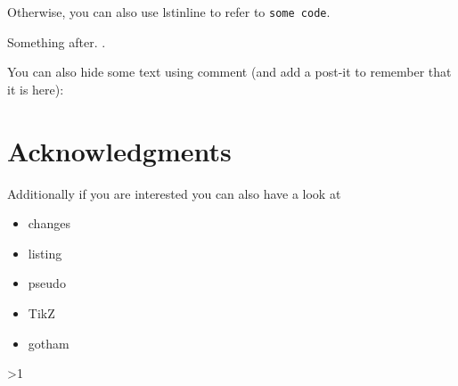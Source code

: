 \documentclass[a4paper]{article}  %
\newcommand{\Pathbasebib}{\PathR/ref_RN.bib,\PathR/ref_XX.bib}%
\begin{document}
	

	Otherwise, you can also use lstinline to refer to \lstinline{some code}.

	Something after.
	.

	You can also hide some text using comment (and add a post-it to remember that it is here):

\section*{Acknowledgments}
	Additionally if you are interested you can also have a look at
	\begin{itemize}
		\item changes
		\item listing
		\item pseudo
		\item TikZ
		\item gotham
	\end{itemize}


\ifnum\value{levelstanda}>1
	{}%
\else

	\printunsrtglossary[type=acronym]
	\printunsrtglossary[type=symbol]
\fi

\addtocounter{levelstanda}{-1}
\end{document}
